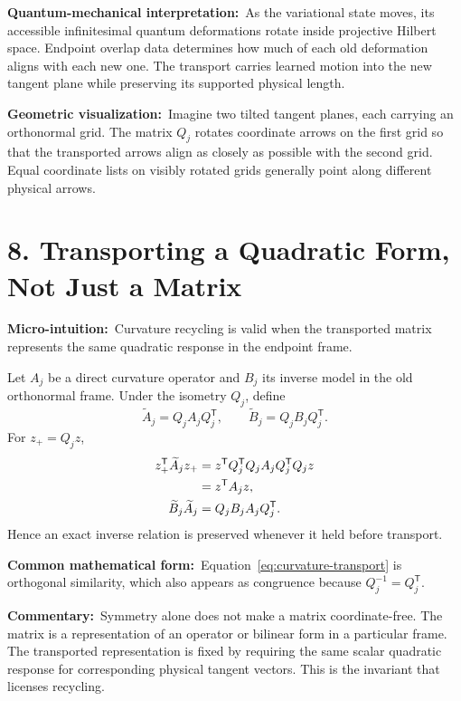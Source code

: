 \documentclass[10pt,twocolumn]{article}
\newcommand{\micro}[1]{\par\noindent\textbf{Micro-intuition:}\ #1\par}
\newcommand{\form}[1]{\par\noindent\textbf{Common mathematical form:}\ #1\par}
\newcommand{\commentary}[1]{\par\noindent\textbf{Commentary:}\ #1\par}
\newcommand{\phys}[1]{\par\noindent\textbf{Quantum-mechanical interpretation:}\ #1\par}
\newcommand{\geom}[1]{\par\noindent\textbf{Geometric visualization:}\ \textcolor{teal!70!black}{#1}\par}
\newcommand{\conceptbreak}{\par\medskip\noindent{\color{black!30}\rule{\columnwidth}{0.35pt}}\par\medskip}
\begin{document}
\phys{As the variational state moves, its accessible infinitesimal quantum
deformations rotate inside projective Hilbert space. Endpoint overlap data
determines how much of each old deformation aligns with each new one. The
transport carries learned motion into the new tangent plane while preserving
its supported physical length.}

\geom{Imagine two tilted tangent planes, each carrying an orthonormal grid. The
matrix \(Q_j\) rotates coordinate arrows on the first grid so that the transported
arrows align as closely as possible with the second grid. Equal coordinate
lists on visibly rotated grids generally point along different physical arrows.}

\conceptbreak

\section*{8. Transporting a Quadratic Form, Not Just a Matrix}

\micro{Curvature recycling is valid when the transported matrix represents the
same quadratic response in the endpoint frame.}

Let \(A_j\) be a direct curvature operator and \(B_j\) its inverse model in the
old orthonormal frame. Under the isometry \(Q_j\), define
\begin{equation}
\widetilde A_j=Q_jA_jQ_j^{\mathsf T},
\qquad
\widetilde B_j=Q_jB_jQ_j^{\mathsf T}.
\label{eq:curvature-transport}
\end{equation}
For \(z_+=Q_jz\),
\begin{align}
z_+^{\mathsf T}\widetilde A_jz_+
&=z^{\mathsf T}Q_j^{\mathsf T}Q_jA_j
Q_j^{\mathsf T}Q_jz
\notag\\
&=z^{\mathsf T}A_jz,
\label{eq:quadratic-invariance}\\
\widetilde B_j\widetilde A_j
&=Q_jB_jA_jQ_j^{\mathsf T}.
\label{eq:inverse-invariance}
\end{align}
Hence an exact inverse relation is preserved whenever it held before transport.

\form{Equation~\eqref{eq:curvature-transport} is orthogonal similarity, which
also appears as congruence because \(Q_j^{-1}=Q_j^{\mathsf T}\).}

\commentary{Symmetry alone does not make a matrix coordinate-free. The matrix
is a representation of an operator or bilinear form in a particular frame. The
transported representation is fixed by requiring the same scalar quadratic
response for corresponding physical tangent vectors. This is the invariant
that licenses recycling.}
\end{document}
